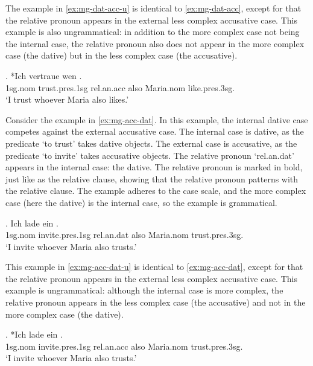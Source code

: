 The example in \ref{ex:mg-dat-acc-u} is identical to \ref{ex:mg-dat-acc}, except for that the relative pronoun appears in the external less complex accusative case. This example is also ungrammatical: in addition to the more complex case not being the internal case, the relative pronoun also does not appear in the more complex case (the dative) but in the less complex case (the accusative).

\exg. *Ich vertraue wen   . \\
1\ac{sg}.\ac{nom} trust.\ac{pres}.1\ac{sg}\scsub{[dat]} \ac{rel}.\ac{an}.\ac{acc} also Maria.\ac{nom} like.\ac{pres}.3\ac{sg}\scsub{[acc]}.\\
`I trust whoever Maria also likes.' \label{ex:mg-dat-acc-u}

Consider the example in \ref{ex:mg-acc-dat}. In this example, the internal dative case competes against the external accusative case.
The internal case is dative, as the predicate  `to trust' takes dative objects.
The external case is accusative, as the predicate  `to invite' takes accusative objects.
The relative pronoun  `\ac{rel}.\ac{an}.\ac{dat}' appears in the internal case: the dative. The relative pronoun is marked in bold, just like as the relative clause, showing that the relative pronoun patterns with the relative clause.
The example adheres to the case scale, and the more complex case (here the dative) is the internal case, so the example is grammatical.

\exg. Ich {lade ein}    . \\
1\ac{sg}.\ac{nom} invite.\ac{pres}.1\ac{sg}\scsub{[acc]} \ac{rel}.\ac{an}.\ac{dat} also Maria.\ac{nom} trust.\ac{pres}.3\ac{sg}\scsub{[dat]}.\\
`I invite whoever Maria also trusts.' \label{ex:mg-acc-dat}

This example in \ref{ex:mg-acc-dat-u} is identical to \ref{ex:mg-acc-dat}, except for that the relative pronoun appears in the external less complex accusative case. This example is ungrammatical: although the internal case is more complex, the relative pronoun appears in the less complex case (the accusative) and not in the more complex case (the dative).

\exg. *Ich {lade ein}    . \\
1\ac{sg}.\ac{nom} invite.\ac{pres}.1\ac{sg}\scsub{[acc]} \ac{rel}.\ac{an}.\ac{acc} also Maria.\ac{nom} trust.\ac{pres}.3\ac{sg}\scsub{[dat]}.\\
`I invite whoever Maria also trusts.' \label{ex:mg-acc-dat-u}

